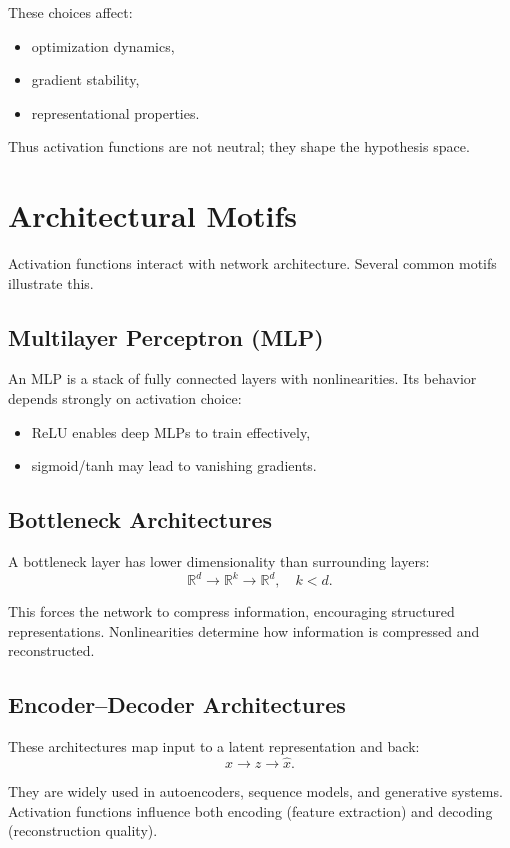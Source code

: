 These choices affect:
\begin{itemize}
    \item optimization dynamics,
    \item gradient stability,
    \item representational properties.
\end{itemize}

Thus activation functions are not neutral; they shape the hypothesis space.

\section{Architectural Motifs}

Activation functions interact with network architecture. Several common motifs illustrate this.

\subsection{Multilayer Perceptron (MLP)}

An MLP is a stack of fully connected layers with nonlinearities. Its behavior depends strongly on activation choice:
\begin{itemize}
    \item ReLU enables deep MLPs to train effectively,
    \item sigmoid/tanh may lead to vanishing gradients.
\end{itemize}

\subsection{Bottleneck Architectures}

A bottleneck layer has lower dimensionality than surrounding layers:
\[
\mathbb R^d \to \mathbb R^k \to \mathbb R^d,\quad k<d.
\]

This forces the network to compress information, encouraging structured representations. Nonlinearities determine how information is compressed and reconstructed.

\subsection{Encoder--Decoder Architectures}

These architectures map input to a latent representation and back:
\[
x \to z \to \hat{x}.
\]

They are widely used in autoencoders, sequence models, and generative systems. Activation functions influence both encoding (feature extraction) and decoding (reconstruction quality).

